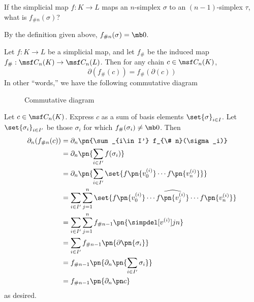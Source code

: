 \begin{problem}[16.15]
  If the simplicial map $f : K \to L$ maps an $n$-simplex $\sigma$ to an
  $(n-1)$-simplex $\tau$, what is $f_{\# n}(\sigma)$?
\end{problem}
\begin{solution}
  By the definition given above, $f_{\# n}(\sigma) = \mb 0$.
\end{solution}
\begin{problem}[16.16]
  Let $f : K \to L$ be a simplicial map, and let $f_\#$ be the induced map $f_\#
  : \msf C_n(K) \to \msf C_n(L)$. Then for any chain $c \in \msf C_n(K)$,
  \[
    \partial (f_\# (c)) = f_{\#}(\partial(c))
  \]
  In other ``words,'' we have the following commutative diagram
  \begin{figure}[H]
    \centering
    \caption{Commutative diagram}
  \end{figure}
\end{problem}
\begin{solution}
  Let $c \in \msf C_n(K)$. Express $c$ as a sum of basis elements
  $\set{\sigma}_{i \in I}$. Let $\set{\sigma_i}_{i \in I'}$ be those $\sigma_i$
  for which $f_{\#}(\sigma_i) \neq \mb 0$. Then
  \begin{align*}
    \partial_{n} (f_{\# n}(c))
    &= \partial_n \pn{\sum_{i\in I'} f_{\# n}(\sigma_i)} \\
    &= \partial_n \pn{\sum_{i \in I'} f(\sigma_i)} \\
    &= \partial_n \pn{\sum_{i\in I'} \set{f\pn{v_0^{(i)}}\cdots f\pn{v_n^{(i)}}}} \\
    &= \sum_{i\in I'} \sum_{j=1}^n \set{f\pn{v_0^{(i)}}\cdots \widehat{f\pn{v_j^{(i)}}}\cdots f\pn{v_n^{(i)}}} \\
    &= \sum_{i \in I'} \sum_{j=1}^n f_{\# n-1} \pn{\simpdel[v^{(i)}]{j}{n}} \\
    &= \sum_{i \in I'} f_{\# n-1}\pn{\partial \pn{\sigma_i}} \\
    &= f_{\# n-1} \pn{ \partial_n \pn{ \sum_{i \in I'} \sigma_i }} \\
    &= f_{\# n-1} \pn{ \partial_n \pn c} \\
  \end{align*}
  as desired.
\end{solution}
